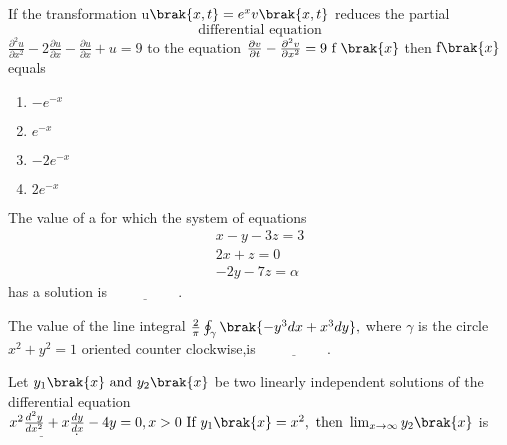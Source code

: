 \iffalse
\chapter{2019}
\author{AI24BTECH11032}
\section{xe}
\fi
\item If the transformation u$\brak{x,t}=e^{x}v\brak{x,t}$ reduces the partial $$ \text{ differential equation }$$ $\frac{\partial^{2}u}{\partial x^{2}}-2\frac{\partial u}{\partial x}-\frac{\partial u}{\partial x}+u=9$  to the equation $\frac{\partial v}{\partial t}-\frac{\partial^{2}v}{\partial x^{2}}=9 \text{ f }\brak{x}$ then $\text{f}\brak{x}$ equals 

\begin{multicols}{4}
    \begin{enumerate}
        \item $-e^{-x}$
        \item $e^{-x}$
        \item $-2e^{-x}$
        \item $2e^{-x}$
    \end{enumerate}
\end{multicols}

\bigskip

\item The value of a for which the system of equations 
\begin{align*}
    x-y-3z=3\\
    2x+z=0\\
    -2y-7z=\alpha
\end{align*}
has a solution is $\underline{\hspace{2cm}}.$
\bigskip

\item The value of the line integral $\frac{2}{\pi}\oint_{\gamma}\brak{-y^{3}dx+x^{3}dy},$ where $\gamma$ is the circle $x^{2}+y^{2}=1$ oriented counter clockwise,is $\underline{\hspace{2cm}}.$
\bigskip

\item Let $y_{1}\brak{x}\text{ and } y_{2}\brak{x}$  be two linearly independent solutions of the differential equation $x^{2}\frac{d^{2}y}{dx^{2}}+x\frac{dy}{dx}-4y=0,x>0\text{ If } y_{1}\brak{x}=x^{2},\text{ then }\lim_{x\to\infty}y_{2}\brak{x}$ is $\underline{\hspace{2cm}}.$
\bigskip

